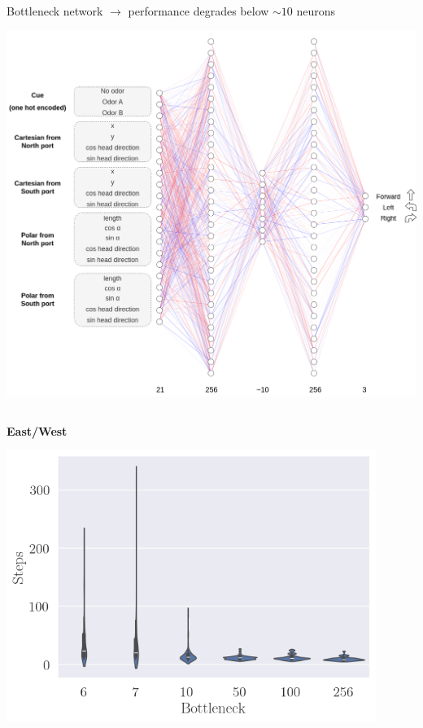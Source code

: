 \documentclass[bigger]{beamer}
\begin{document}
\begin{frame}[label={sec:org8212a43}]{Bottleneck network \(\to\) performance degrades below \(\sim\!10\) neurons}
\begin{center}
\includegraphics[height=0.4\textheight]{medias/NN-architecture-bottleneck.drawio.png}
\end{center}
\vspace{-3em}
\begin{columns}
\begin{column}[c]{0.5\columnwidth}
\begin{center}
\small
\textbf{East/West}\\
\end{center}
\begin{center}
\includegraphics[width=0.9\textwidth]{medias/steps-boxplot-EastWest.png}

\end{center}
\end{column}
\end{columns}
\end{frame}
\end{document}
